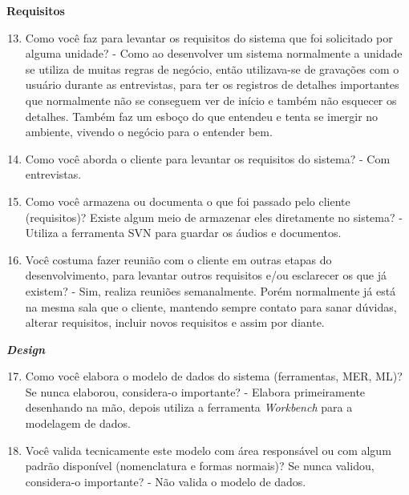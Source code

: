 \begin{apendicesenv}
\textbf{Requisitos}

\begin{enumerate}
	\setcounter{enumi}{12}
	\item Como você faz para levantar os requisitos do sistema que foi solicitado por alguma
	unidade?\newline
	- Como ao desenvolver um sistema normalmente a unidade se utiliza de muitas regras de negócio, então utilizava-se de gravações com o usuário durante as entrevistas, para ter os registros de detalhes importantes que normalmente não se conseguem ver de início e também não esquecer os detalhes. Também faz um esboço do que entendeu e tenta se imergir no ambiente, vivendo o negócio para o entender bem.
	\item Como você aborda o cliente para levantar os requisitos do sistema?\newline
	- Com entrevistas.
	\item Como você armazena ou documenta o que foi passado pelo cliente (requisitos)? Existe
	algum meio de armazenar eles diretamente no sistema?\newline
	- Utiliza a ferramenta SVN para guardar os áudios e documentos.
	\item Você costuma fazer reunião com o cliente em outras etapas do desenvolvimento, para
	levantar outros requisitos e/ou esclarecer os que já existem?\newline
	- Sim, realiza reuniões semanalmente. Porém normalmente já está na mesma sala que o cliente, mantendo sempre contato para sanar dúvidas, alterar requisitos, incluir novos requisitos e assim por diante.
\end{enumerate}

\textbf{\textit{Design}}

\begin{enumerate}
	\setcounter{enumi}{16}
	\item Como você elabora o modelo de dados do sistema (ferramentas, MER, ML)? Se nunca
	elaborou, considera-o importante?\newline
	- Elabora primeiramente desenhando na mão, depois utiliza a ferramenta \textit{Workbench} para a modelagem de dados.
	\item Você valida tecnicamente este modelo com área responsável ou com algum padrão
	disponível (nomenclatura e formas normais)? Se nunca validou, considera-o importante?\newline
	- Não valida o modelo de dados.
\end{enumerate}


\end{apendicesenv}
